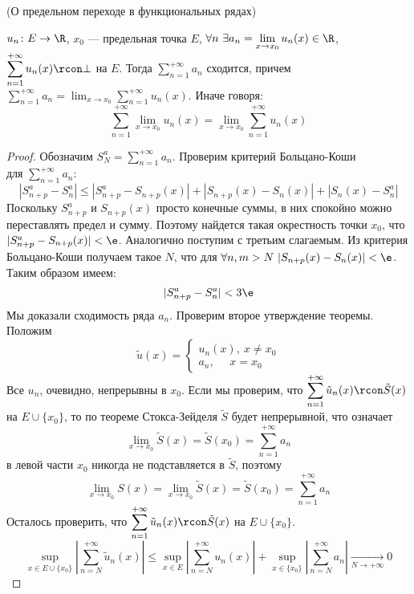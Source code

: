 \begin{theorem}(О предельном переходе в функциональных рядах)

    $u_n \colon E \to \R$, $x_0$ --- предельная точка $E$, $\displaystyle
    \forall n~ \exists a_n = \lim_{x \to x_0}{u_n(x)} \in \R$, $\displaystyle
    \sum_{n = 1}^{+\infty}{u_n(x)} \rcon \bot$ на $E$. Тогда $\displaystyle
    \sum_{n = 1}^{+\infty}{a_n}$ сходится, причем $\displaystyle \sum_{n =
    1}^{+\infty}{a_n} = \lim_{x \to x_0}{\sum_{n = 1}^{+\infty}{u_n(x)}}$.
    Иначе говоря:
\[
    \sum_{n = 1}^{+\infty}{\lim_{x \to x_0}{u_n(x)}}
    = \lim_{x \to x_0}{\sum_{n = 1}^{+\infty}{u_n(x)}}
\]
\end{theorem}
\begin{proof}

    Обозначим $\displaystyle S^a_N = \sum_{n = 1}^{+\infty}{a_n}$. Проверим
    критерий Больцано-Коши \\ для $\displaystyle \sum_{n = 1}^{+\infty}{a_n}$:
\[
    |S^a_{n + p} - S^a_n| \leqslant |S^a_{n + p} - S_{n + p}(x)|
    + |S_{n + p}(x) - S_n(x)|
    + |S_n(x) - S^a_n|
\]
    Поскольку $S^a_{n + p}$ и $S_{n + p}(x)$ просто конечные суммы, в них
    спокойно можно переставлять предел и сумму. Поэтому найдется такая
    окрестность точки $x_0$, что \\ $|S^a_{n + p} - S_{n + p}(x)| < \e$.
    Аналогично поступим с третьим слагаемым. Из критерия Больцано-Коши получаем
    такое $N$, что для $\forall n, m > N~ |S_{n + p}(x) - S_n(x)| < \e$.
    Таким образом имеем:
\[
    |S^a_{n + p} - S^a_n| < 3\e
\]
    Мы доказали сходимость ряда $a_n$. Проверим второе утверждение теоремы.
    Положим
\[
    \tilde{u}(x) = \begin{cases}
                    u_n(x),~ x \neq x_0 \\
                    a_n,~~~~~~ x = x_0
                    \end{cases}
\]
    Все $u_n$, очевидно, непрерывны в $x_0$. Если мы проверим, что
    $\displaystyle \sum_{n = 1}^{+\infty}{\tilde{u}_n(x)} \rcon \tilde{S}(x)$
    на $E \cup \{x_0\}$, то по теореме Стокса-Зейделя $\tilde{S}$ будет
    непрерывной, что означает
\[
    \lim_{x \to x_0}{\tilde{S}(x)} = \tilde{S}(x_0) = \sum_{n =
    1}^{+\infty}{a_n}
\]
    в левой части $x_0$ никогда не подставляется в $\tilde{S}$, поэтому
\[
    \lim_{x \to x_0}{S(x)} = \lim_{x \to x_0}{\tilde{S}(x)} = \tilde{S}(x_0) =
    \sum_{n = 1}^{+\infty}{a_n}
\]
    Осталось проверить, что $\displaystyle \sum_{n =
    1}^{+\infty}{\tilde{u}_n(x)} \rcon \tilde{S}(x)$ на $E \cup \{x_0\}$.
\[
    \sup_{x \in E \cup \{x_0\}}{\left|\sum_{n =
    N}^{+\infty}{\tilde{u}_n(x)}\right|} \leqslant \sup_{x \in E}{\left|
    \sum_{n = N}^{+\infty}{u_n(x)} \right|} + \sup_{x \in \{x_0\}}{\left|
    \sum_{n = N}^{+\infty}{a_n} \right|} \xrightarrow[N \to +\infty]{} 0
\]
\end{proof}

